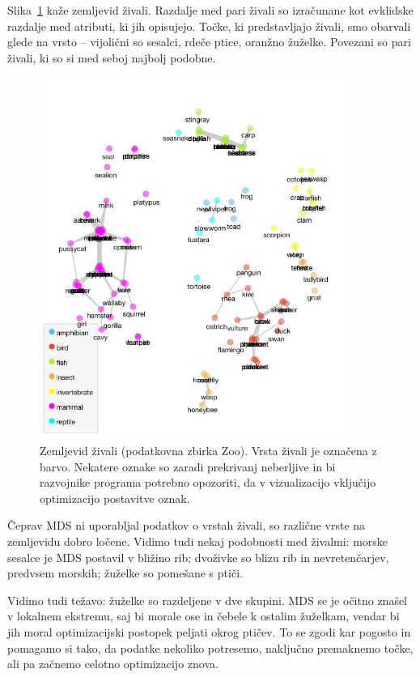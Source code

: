 Slika~\ref{f-zoo-mds} kaže zemljevid živali. Razdalje med pari živali so izračunane kot evklidske razdalje med atributi, ki jih opisujejo. Točke, ki predstavljajo živali, smo obarvali glede na vrsto -- vijolični so sesalci, rdeče ptice, oranžno žuželke. Povezani so pari živali, ki so si med seboj najbolj podobne.

\begin{figure}[tbp]
\begin{center}
\includegraphics[width=10cm]{slike/zoo-mds.png}
\caption{Zemljevid živali (podatkovna zbirka Zoo). Vrsta živali je označena z barvo. Nekatere oznake so zaradi prekrivanj neberljive in bi razvojnike programa potrebno opozoriti, da v vizualizacijo vključijo optimizacijo postavitve oznak.}
\label{f-zoo-mds}
\end{center}
\end{figure}

Čeprav MDS ni uporabljal podatkov o vrstah živali, so različne vrste na zemljevidu dobro ločene. Vidimo tudi nekaj podobnosti med živalmi: morske sesalce je MDS postavil v bližino rib; dvoživke so blizu rib in nevretenčarjev, predvsem morskih; žuželke so pomešane s ptiči.

Vidimo tudi težavo: žuželke so razdeljene v dve skupini. MDS se je očitno znašel v lokalnem ekstremu, saj bi morale ose in čebele k ostalim žuželkam, vendar bi jih moral optimizacijski postopek peljati okrog ptičev. To se zgodi kar pogosto in pomagamo si tako, da podatke nekoliko potresemo, naključno premaknemo točke, ali pa začnemo celotno optimizacijo znova.

